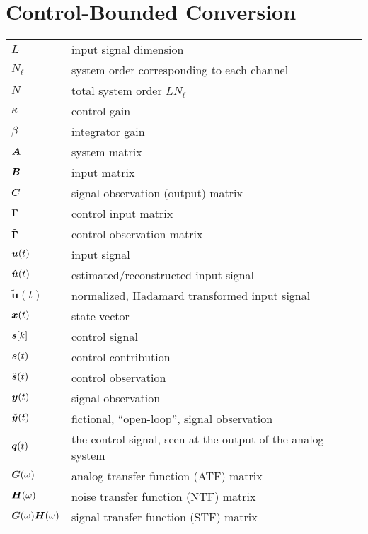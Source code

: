 \section*{Control-Bounded Conversion}
\begin{tabular}{ p{2cm} l }
    $L$         &  input signal dimension \\
    $N_\ell$    &  system order corresponding to each channel \\
    $N$         &  total system order $L N_\ell$ \\
    $\kappa$    &  control gain \\
    $\beta$     &  integrator gain \\
    $\bm{A}$     &  system matrix \\
    $\bm{B}$     &  input matrix \\
    $\bm{C}$     &  signal observation (output) matrix \\
    $\bm{\Gamma}$     &  control input matrix \\
    $\tilde{\bm{\Gamma}}$&  control observation matrix \\
    $\bm{u}(t)$      &  input signal \\
    $\hat{\bm{u}}(t)$   &  estimated/reconstructed input signal \\
    $\tilde{\bm{u}}(t)$   &  normalized, Hadamard transformed input signal  \\
    $\bm{x}(t)$      &  state vector \\
    $\bm{s}[k]$      &  control signal \\
    $\bm{s}(t)$      &  control contribution \\
    $\tilde{\bm{s}}(t)$ &  control observation \\
    $\bm{y}(t)$      &  signal observation \\
    $\breve{\bm{y}}(t)$ &  fictional, \enquote{open-loop}, signal observation \\
    $\bm{q}(t)$      &  the control signal, seen at the output of the analog system \\
    $\bm{G}(\omega)$       &  analog transfer function (ATF) matrix \\
    $\bm{H}(\omega)$       &  noise transfer function (NTF) matrix \\
    $\bm{G}(\omega)\bm{H}(\omega)$    &  signal transfer function (STF) matrix \\


\end{tabular}

